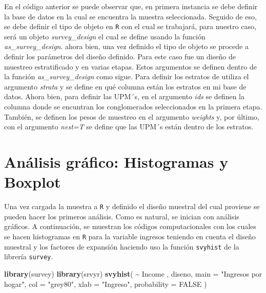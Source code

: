 \documentclass[
  12pt,
]{book}
\newenvironment{Shaded}{\begin{snugshade}}{\end{snugshade}}
\newcommand{\AttributeTok}[1]{\textcolor[rgb]{0.13,0.29,0.53}{#1}}
\newcommand{\ConstantTok}[1]{\textcolor[rgb]{0.56,0.35,0.01}{#1}}
\newcommand{\FunctionTok}[1]{\textcolor[rgb]{0.13,0.29,0.53}{\textbf{#1}}}
\newcommand{\NormalTok}[1]{#1}
\newcommand{\SpecialCharTok}[1]{\textcolor[rgb]{0.81,0.36,0.00}{\textbf{#1}}}
\newcommand{\StringTok}[1]{\textcolor[rgb]{0.31,0.60,0.02}{#1}}
\begin{document}
En el código anterior se puede observar que, en primera instancia se debe definir la base de datos en la cual se encuentra la muestra seleccionada. Seguido de eso, se debe definir el tipo de objeto en \texttt{R} con el cual se trabajará, para nuestro caso, será un objeto \emph{survey\_design} el cual se define usando la función \emph{as\_survey\_design}. ahora bien, una vez definido el tipo de objeto se procede a definir los parámetros del diseño definido. Para este caso fue un diseño de muestreo estratificado y en varias etapas. Estos argumentos se definen dentro de la función \emph{as\_survey\_design} como sigue. Para definir los estratos de utiliza el argumento \emph{strata} y se define en qué columna están los estratos en mi base de datos. Ahora bien, para definir las UPM´s, en el argumento \emph{ids} se definen la columna donde se encuntran los conglomerados seleccionados en la primera etapa. También, se definen los pesos de muestreo en el argumento \emph{weights} y, por último, con el argumento \emph{nest=T} se define que las UPM´s están dentro de los estratos.

\section{Análisis gráfico: Histogramas y Boxplot}\label{anuxe1lisis-gruxe1fico-histogramas-y-boxplot}

Una vez cargada la muestra a \texttt{R} y definido el diseño muestral del cual proviene se pueden hacer los primeros análisis. Como es natural, se inician con análisis gráficos. A continuación, se muestran los códigos computacionales con los cuales se hacen histogramas en \texttt{R} para la variable ingresos teniendo en cuenta el diseño muestral y los factores de expansión haciendo uso la función \texttt{svyhist} de la librería \texttt{survey}.

\begin{Shaded}
\begin{Highlighting}[]
\FunctionTok{library}\NormalTok{(survey)}
\FunctionTok{library}\NormalTok{(srvyr)}
\FunctionTok{svyhist}\NormalTok{(}
  \SpecialCharTok{\textasciitilde{}}\NormalTok{ Income ,}
\NormalTok{  diseno,}
  \AttributeTok{main =} \StringTok{"Ingresos por hogar"}\NormalTok{,}
  \AttributeTok{col =} \StringTok{"grey80"}\NormalTok{,}
  \AttributeTok{xlab =} \StringTok{"Ingreso"}\NormalTok{,}
  \AttributeTok{probability =} \ConstantTok{FALSE}
\NormalTok{)}
\end{Highlighting}
\end{Shaded}
\end{document}
